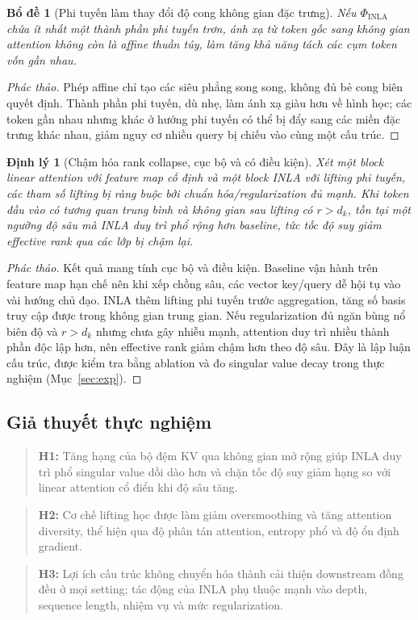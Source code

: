 \documentclass[12pt,a4paper]{article}
\newtheorem{theorem}{Định lý}[section]
\newtheorem{lemma}{Bổ đề}[section]
\begin{document}
\begin{lemma}[Phi tuyến làm thay đổi độ cong không gian đặc trưng]
Nếu $\Phi_{\mathrm{INLA}}$ chứa ít nhất một thành phần phi tuyến trơn, ánh xạ từ token gốc sang không
gian attention không còn là affine thuần túy, làm tăng khả năng tách các cụm token vốn gần nhau.
\end{lemma}
\begin{proof}[Phác thảo]
Phép affine chỉ tạo các siêu phẳng song song, không đủ bẻ cong biên quyết định. Thành phần phi tuyến,
dù nhẹ, làm ánh xạ giàu hơn về hình học; các token gần nhau nhưng khác ở hướng phi tuyến có thể bị
đẩy sang các miền đặc trưng khác nhau, giảm nguy cơ nhiều query bị chiếu vào cùng một cấu trúc.
\end{proof}

\begin{theorem}[Chậm hóa rank collapse, cục bộ và có điều kiện]
Xét một block linear attention với feature map cố định và một block INLA với lifting phi tuyến, các
tham số lifting bị ràng buộc bởi chuẩn hóa/regularization đủ mạnh. Khi token đầu vào có tương quan
trung bình và không gian sau lifting có $r > d_k$, tồn tại một ngưỡng độ sâu mà INLA duy trì phổ
rộng hơn baseline, tức tốc độ suy giảm effective rank qua các lớp bị chậm lại.
\end{theorem}
\begin{proof}[Phác thảo]
Kết quả mang tính cục bộ và điều kiện. Baseline vận hành trên feature map hạn chế nên khi xếp chồng
sâu, các vector key/query dễ hội tụ vào vài hướng chủ đạo. INLA thêm lifting phi tuyến trước
aggregation, tăng số basis truy cập được trong không gian trung gian. Nếu regularization đủ ngăn
bùng nổ biên độ và $r > d_k$ nhưng chưa gây nhiễu mạnh, attention duy trì nhiều thành phần độc lập
hơn, nên effective rank giảm chậm hơn theo độ sâu. Đây là lập luận cấu trúc, được kiểm tra bằng
ablation và đo singular value decay trong thực nghiệm (Mục~\ref{sec:exp}).
\end{proof}

\subsection{Giả thuyết thực nghiệm}
\begin{quote}
\textbf{H1:} Tăng hạng của bộ đệm KV qua không gian mở rộng giúp INLA duy trì phổ singular value dồi
dào hơn và chặn tốc độ suy giảm hạng so với linear attention cổ điển khi độ sâu tăng.
\end{quote}
\begin{quote}
\textbf{H2:} Cơ chế lifting học được làm giảm oversmoothing và tăng attention diversity, thể hiện qua
độ phân tán attention, entropy phổ và độ ổn định gradient.
\end{quote}
\begin{quote}
\textbf{H3:} Lợi ích cấu trúc không chuyển hóa thành cải thiện downstream đồng đều ở mọi setting; tác
động của INLA phụ thuộc mạnh vào depth, sequence length, nhiệm vụ và mức regularization.
\end{quote}
\end{document}
